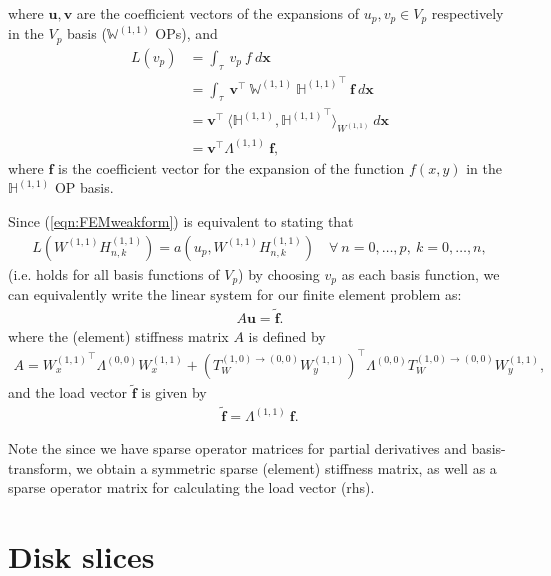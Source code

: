 \documentclass[11pt, oneside]{article}   	%
\newcommand{\hdop}{H}
\newcommand{\Wii}{W^{(1,1)}}
\newcommand{\hdopii}{\hdop^{(1,1)}}
\newcommand{\bighdopii}{{\mathbb{\hdop}^{(1,1)}}}
\newcommand{\element}{\tau}
\newcommand{\bigWii}{{\mathbb{W}^{(1,1)}}}
\begin{document}
where $\mathbf{u}, \mathbf{v}$ are the coefficient vectors of the expansions of $u_p, v_p \in V_p$ respectively in the $V_p$ basis ($\bigWii$ OPs), and
\begin{align*}
	L(v_p) &= \int_\element \: v_p \: f \: d\mathbf{x} \\
	&= \int_\element \: \mathbf{v}^\top \: \bigWii \: \bighdopii^\top \: \mathbf{f} \: d\mathbf{x} \\
	&= \mathbf{v}^\top \: \langle \bighdopii, {\bighdopii}^\top \rangle_{\Wii} \: d\mathbf{x} \\
	&= \mathbf{v}^\top \Lambda^{(1,1)} \: \mathbf{f},
\end{align*}
where $\mathbf{f}$ is the coefficient vector for the expansion of the function $f(x,y)$ in the $\bighdopii$ OP basis.

Since (\ref{eqn:FEMweakform}) is equivalent to stating that
\begin{align*}
	L(\Wii \hdopii_{n,k}) = a(u_p,\Wii \hdopii_{n,k}) \quad \forall \: n = 0,\dots,p, \: k = 0,\dots,n,
\end{align*}
(i.e. holds for all basis functions of $V_p$) by choosing $v_p$ as each basis function, we can equivalently write the linear system for our finite element problem as:
\begin{align*}
A\mathbf{u} = \tilde{\mathbf{f}}.
\end{align*}
where the (element) stiffness matrix $A$ is defined by 
\begin{align*}
A = {\Wii_x}^\top \Lambda^{(0,0)} \Wii_x + ({T_W^{(1,0)\to(0,0)} \Wii_y})^\top \Lambda^{(0,0)} T_W^{(1,0)\to(0,0)} \Wii_y, 
\end{align*}
and the load vector $\tilde{\mathbf{f}}$ is given by 
\begin{align*}
\tilde{\mathbf{f}} = \Lambda^{(1,1)} \: \mathbf{f}.
\end{align*}

Note the since we have sparse operator matrices for partial derivatives and basis-transform, we obtain a symmetric sparse (element) stiffness matrix, as well as a sparse operator matrix for calculating the load vector (rhs).

\section{Disk slices}\label{Appendix:DiskSlices}
\end{document}
